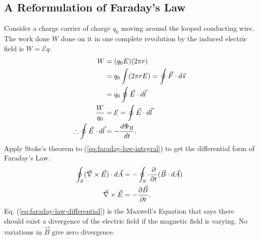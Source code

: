 \documentclass[12pt,b4paper]{article}
\begin{document}
\subsection{A Reformulation of Faraday’s Law}
Consider a charge carrier of charge $q_0$ moving around the looped conducting wire. The work done $W$ done on it in one complete revolution by the induced electric field is $W=\mathcal{E}q$.
\begin{align}
    W&=(q_0E)(2\pi r)\notag\\
    &=q_0\int(2\pi rE)=\oint\vec{F}\cdot d\vec{s}\notag\\
    &=q_0\oint\vec{E}\cdot d\vec{l}\notag\\
    \frac{W}{q_0}&=\mathcal{E}=\oint\vec{E}\cdot d\vec{l}\notag\\
    \therefore\oint\vec{E}\cdot d\vec{l}&=-\frac{d\Phi_B}{dt}.\label{eq:faraday-law-integral}
\end{align}
Apply Stoke's theorem to (\ref{eq:faraday-law-integral}) to get the differential form of Faraday's Law.
\begin{align}
    \oint_S(\vec{\nabla}\times\vec{E})\cdot d\vec{A}&=-\oint_S\cdot\frac{\partial}{\partial t}(\vec{B}\cdot d\vec{A})\notag\\
    \vec{\nabla}\times\vec{E}&=-\frac{\partial\vec{B}}{\partial t}.\label{eq:faraday-law-differential}
\end{align}
Eq. (\ref{eq:faraday-law-differential}) is the  Maxwell's Equation that says there should exist a divergence of the electric field if the magnetic field is varying. No variations in $\vec{B}$ give zero divergence.
\end{document}
